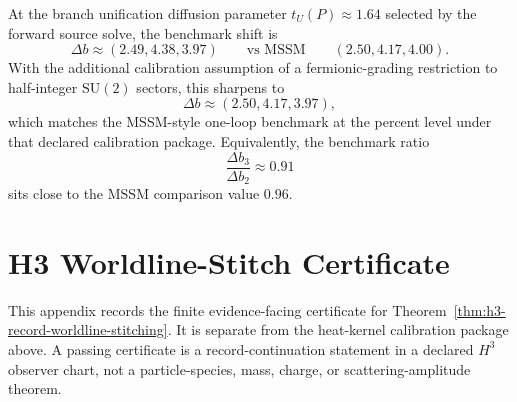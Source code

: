 At the branch unification diffusion parameter \(t_U(P)\approx 1.64\) selected
by the forward source solve, the benchmark shift is
\[
\Delta b\approx (2.49,4.38,3.97)
\qquad
\text{vs MSSM}
\qquad
(2.50,4.17,4.00).
\]
With the additional calibration assumption of a fermionic-grading restriction to
half-integer \(\mathrm{SU}(2)\) sectors, this sharpens to
\[
\Delta b\approx (2.50,4.17,3.97),
\]
which matches the MSSM-style one-loop benchmark at the percent level under that declared
calibration package. Equivalently, the benchmark ratio
\[
\frac{\Delta b_3}{\Delta b_2}\approx 0.91
\]
sits close to the MSSM comparison value \(0.96\).

\section{H3 Worldline-Stitch Certificate}\label{app:h3-worldline-certificate}

This appendix records the finite evidence-facing certificate for
Theorem~\ref{thm:h3-record-worldline-stitching}. It is separate from the heat-kernel
calibration package above. A passing certificate is a record-continuation statement in a declared
\(H^3\) observer chart, not a particle-species, mass, charge, or scattering-amplitude theorem.

